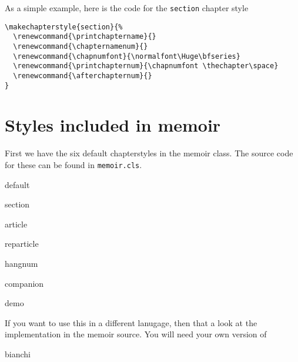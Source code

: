 As a simple example, here is the code for the \texttt{section} chapter
style
\begin{Verbatim}[label={Source code for the \textsf{section} chapter style}]
\makechapterstyle{section}{%
  \renewcommand{\printchaptername}{}
  \renewcommand{\chapternamenum}{}
  \renewcommand{\chapnumfont}{\normalfont\Huge\bfseries}
  \renewcommand{\printchapternum}{\chapnumfont \thechapter\space}
  \renewcommand{\afterchapternum}{}
}
\end{Verbatim}



\clearpage

\chapter{Styles included in memoir}
\label{cha:defa-styl-incl}

First we have the six default chapterstyles in the memoir class. The
source code for these can be found in \texttt{memoir.cls}.


\begin{showchapterstyle}{default}
\end{showchapterstyle}

\newpage

\begin{showchapterstyle}{section}
\end{showchapterstyle}
\begin{showchapterstyle}{article}
\end{showchapterstyle}

\newpage

\begin{showchapterstyle}{reparticle}
\end{showchapterstyle}
\begin{showchapterstyle}{hangnum}
\end{showchapterstyle}

\newpage

\begin{showchapterstyle}{companion}
\end{showchapterstyle}
\begin{showchapterstyle}{demo}
\end{showchapterstyle}
If you want to use this in a different lanugage, then that a look at
the implementation in the memoir source. You will need your own
version of 

\begin{showchapterstyle}{bianchi}
\end{showchapterstyle}


